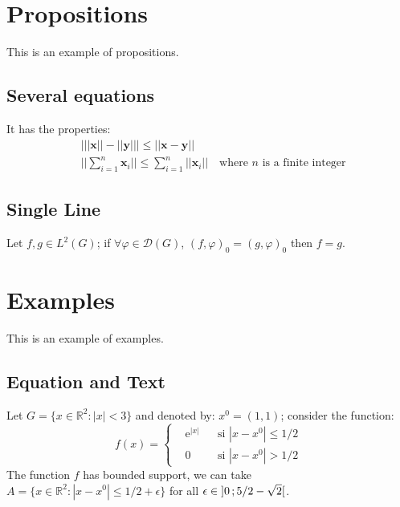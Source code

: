 \documentclass[11pt,fleqn,a5paper]{book} %
\begin{document}
    \section{Propositions}
    
    This is an example of propositions.
    
    \subsection{Several equations}
    
    \begin{proposition}
    It has the properties:
    \begin{align}
    & \big| ||\mathbf{x}|| - ||\mathbf{y}|| \big|\leq || \mathbf{x}- \mathbf{y}||\\
    &  ||\sum_{i=1}^n\mathbf{x}_i||\leq \sum_{i=1}^n||\mathbf{x}_i||\quad\text{where $n$ is a finite integer}
    \end{align}
    \end{proposition}
    
    \subsection{Single Line}
    
    \begin{proposition} 
    Let $f,g\in L^2(G)$; if $\forall \varphi\in\mathcal{D}(G)$, $(f,\varphi)_0=(g,\varphi)_0$ then $f = g$. 
    \end{proposition}
    
    
    \section{Examples}
    
    This is an example of examples.
    
    \subsection{Equation and Text}
    
    \begin{example}
    Let $G=\{x\in\mathbb{R}^2:|x|<3\}$ and denoted by: $x^0=(1,1)$; consider the function:
    \begin{equation}
    f(x)=\left\{\begin{aligned} & \mathrm{e}^{|x|} & & \text{si $|x-x^0|\leq 1/2$}\\
    & 0 & & \text{si $|x-x^0|> 1/2$}\end{aligned}\right.
    \end{equation}
    The function $f$ has bounded support, we can take $A=\{x\in\mathbb{R}^2:|x-x^0|\leq 1/2+\epsilon\}$ for all $\epsilon\in\mathopen{]}0\,;5/2-\sqrt{2}\mathclose{[}$.
    \end{example}
    
\end{document}
